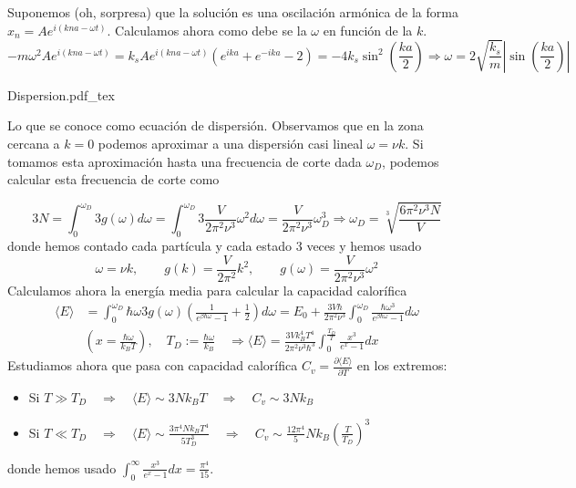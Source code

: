 \documentclass[leqno]{article}
\newcommand{\incfig}[1]{%
\center
\def\svgwidth{0.9\columnwidth}
{#1.pdf_tex}
}
\begin{document}
Suponemos (oh, sorpresa) que la solución es una oscilación armónica de la forma $x_n = A e^{i(kna-\omega t)}$. Calculamos ahora como debe se la $\omega $ en función de la $k$.
 \[
   -m\omega ^2 Ae^{i(kna-\omega t)} = k_sAe^{i(kna-\omega t)}(e^{ika}+e^{-ika}-2) = -4k_s \sin^2\left( \frac{ka}{2} \right)  \Rightarrow \boxed{\omega = 2 \sqrt{\frac{k_s}{m}}\left|\sin \left( \frac{ka}{2} \right) \right| }
\] 

\begin{minipage}{0.2\textwidth}
  \incfig{Dispersion}
\end{minipage}
\begin{minipage}{0.8\textwidth}
Lo que se conoce como ecuación de dispersión. Observamos que en la zona cercana a $k=0$ podemos aproximar a una dispersión casi lineal  $\omega =\nu k$. Si tomamos esta aproximación hasta una frecuencia de corte dada $\omega _D$, podemos calcular esta frecuencia de corte como
\end{minipage}

\[
  3N = \int_0^{\omega _D} 3g(\omega )d\omega =\int_0^{\omega _D}3 \frac{V}{2\pi^2\nu^3}\omega ^2 d\omega = \frac{V}{2\pi^2 \nu^3}\omega _D^3 \Rightarrow \boxed{\omega _D = \sqrt[3]{\frac{6\pi^2\nu^3N}{V}} }
\] 
donde hemos contado cada partícula y cada estado 3 veces y hemos usado
\[
\omega = \nu k, \qquad g(k)=\frac{V}{2\pi^2}k^2, \qquad g(\omega )= \frac{V}{2\pi^2 \nu^3}\omega ^2
\]
Calculamos ahora la energía media para calcular la capacidad calorífica
\begin{align*}
  \langle E \rangle &= \int_0^{\omega _D}\hbar \omega 3g(\omega )\left( \frac{1}{e^{\beta \hbar \omega }-1} +\frac{1}{2} \right) d\omega  = E_0 + \frac{3V\hbar }{2\pi^2\nu^3} \int_0^{\omega _D}\frac{\hbar \omega ^3}{e^{\beta \hbar \omega }-1} d\omega \\
	   & (x=\frac{\hbar \omega }{k_B T}), \quad T_D := \frac{\hbar \omega }{k_B} \quad   \Rightarrow  \boxed{\langle E \rangle = \frac{3Vk_B^4T^4}{2\pi^2\nu^3\hbar ^3}\int_0^{\frac{T_D}{T}}\frac{x^3}{e^x-1}dx }
\end{align*}
Estudiamos ahora que pasa con capacidad calorífica $C_v = \frac{\partial \langle E \rangle }{\partial T}$ en los extremos:
\begin{itemize}[topsep=-6pt, itemsep=0pt]
  \item Si $T\gg T_D \quad \Rightarrow \quad \langle E \rangle \sim 3Nk_BT \quad \Rightarrow \quad C_v \sim  3Nk_B $
  \item Si $T\ll T_D \quad \Rightarrow \quad \langle E \rangle \sim  \frac{3\pi^4Nk_BT^4}{5T_D^3}\quad\Rightarrow \quad C_v \sim  \frac{12\pi^4}{5}Nk_B \left( \frac{T}{T_D} \right)^3 $
\end{itemize}
donde hemos usado $\int_0^\infty \frac{x^3}{e^x-1}dx=\frac{\pi^4}{15}$.
\end{document}
